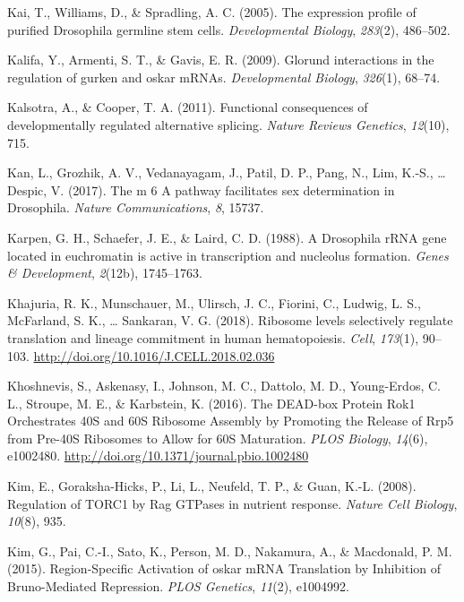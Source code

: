 \documentclass[12pt,oneside]{reedthesis}
\newlength{\cslhangindent}
\newenvironment{cslreferences}%
  {\setlength{\parindent}{0pt}%
  \everypar{\setlength{\hangindent}{\cslhangindent}}\ignorespaces}%
  {\par}
\begin{document}
\begin{cslreferences}
\leavevmode\hypertarget{ref-Kai2005}{}%
Kai, T., Williams, D., \& Spradling, A. C. (2005). The expression profile of purified Drosophila germline stem cells. \emph{Developmental Biology}, \emph{283}(2), 486--502.

\leavevmode\hypertarget{ref-Kalifa2009}{}%
Kalifa, Y., Armenti, S. T., \& Gavis, E. R. (2009). Glorund interactions in the regulation of gurken and oskar mRNAs. \emph{Developmental Biology}, \emph{326}(1), 68--74.

\leavevmode\hypertarget{ref-Kalsotra2011}{}%
Kalsotra, A., \& Cooper, T. A. (2011). Functional consequences of developmentally regulated alternative splicing. \emph{Nature Reviews Genetics}, \emph{12}(10), 715.

\leavevmode\hypertarget{ref-Kan2017}{}%
Kan, L., Grozhik, A. V., Vedanayagam, J., Patil, D. P., Pang, N., Lim, K.-S., \ldots{} Despic, V. (2017). The m 6 A pathway facilitates sex determination in Drosophila. \emph{Nature Communications}, \emph{8}, 15737.

\leavevmode\hypertarget{ref-Karpen1988a}{}%
Karpen, G. H., Schaefer, J. E., \& Laird, C. D. (1988). A Drosophila rRNA gene located in euchromatin is active in transcription and nucleolus formation. \emph{Genes \& Development}, \emph{2}(12b), 1745--1763.

\leavevmode\hypertarget{ref-Khajuria2018a}{}%
Khajuria, R. K., Munschauer, M., Ulirsch, J. C., Fiorini, C., Ludwig, L. S., McFarland, S. K., \ldots{} Sankaran, V. G. (2018). Ribosome levels selectively regulate translation and lineage commitment in human hematopoiesis. \emph{Cell}, \emph{173}(1), 90--103. \url{http://doi.org/10.1016/J.CELL.2018.02.036}

\leavevmode\hypertarget{ref-khoshnevisDEADboxProteinRok12016}{}%
Khoshnevis, S., Askenasy, I., Johnson, M. C., Dattolo, M. D., Young-Erdos, C. L., Stroupe, M. E., \& Karbstein, K. (2016). The DEAD-box Protein Rok1 Orchestrates 40S and 60S Ribosome Assembly by Promoting the Release of Rrp5 from Pre-40S Ribosomes to Allow for 60S Maturation. \emph{PLOS Biology}, \emph{14}(6), e1002480. \url{http://doi.org/10.1371/journal.pbio.1002480}

\leavevmode\hypertarget{ref-Kim2008b}{}%
Kim, E., Goraksha-Hicks, P., Li, L., Neufeld, T. P., \& Guan, K.-L. (2008). Regulation of TORC1 by Rag GTPases in nutrient response. \emph{Nature Cell Biology}, \emph{10}(8), 935.

\leavevmode\hypertarget{ref-Kim2015m}{}%
Kim, G., Pai, C.-I., Sato, K., Person, M. D., Nakamura, A., \& Macdonald, P. M. (2015). Region-Specific Activation of oskar mRNA Translation by Inhibition of Bruno-Mediated Repression. \emph{PLOS Genetics}, \emph{11}(2), e1004992.


\end{cslreferences}
\end{document}
